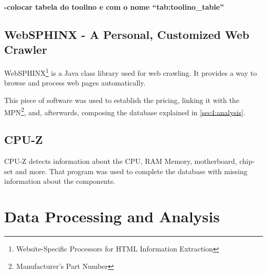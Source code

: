     \textbf{-colocar tabela do toolino e com o nome ``tab:toolino\_table''}
    
    
    \subsection{WebSPHINX - A Personal, Customized Web Crawler} \label{sec3:websphinx}
        WebSPHINX\footnote{Website-Specific Processors for HTML Information Extraction} is a Java class library used for web crawling. It provides a way to browse and process web pages automatically.
        
        This piece of software was used to establish the pricing, linking it with the MPN\footnote{Manufacturer's Part Number}, and, afterwards, composing the database explained in \ref{sec4:analysis}. 
    
    \subsection{CPU-Z} \label{sec3:cpu-z}
        CPU-Z detects information about the CPU, RAM Memory, motherboard, chip-set and more. That program was used to complete the database with missing information about the components.

\section{Data Processing and Analysis} \label{sec3:data_processing_analysis}
